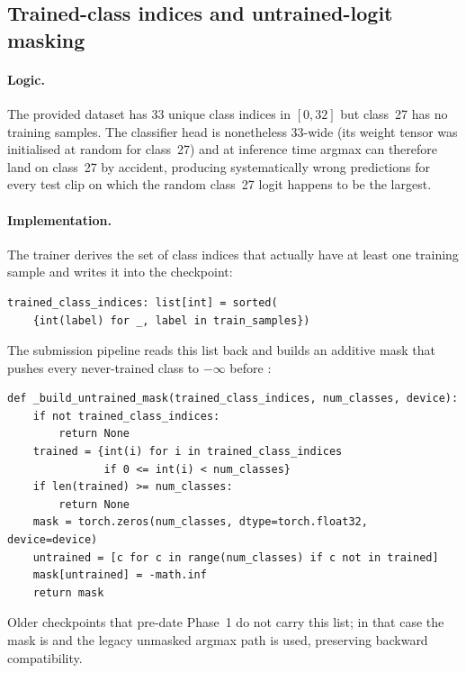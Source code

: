 \subsection{Trained-class indices and untrained-logit masking}
\label{sec:phase1:masking}

\paragraph{Logic.} The provided dataset has 33 unique class indices in
\([0, 32]\) but class~27 has no training samples. The classifier head is
nonetheless 33-wide (its weight tensor was initialised at random for
class~27) and at inference time argmax can therefore land on class~27 by
accident, producing systematically wrong predictions for every test
clip on which the random class~27 logit happens to be the largest.

\paragraph{Implementation.} The trainer derives the set of class indices
that actually have at least one training sample and writes it into the
checkpoint:

\begin{lstlisting}[style=py]
trained_class_indices: list[int] = sorted(
    {int(label) for _, label in train_samples})
\end{lstlisting}

The submission pipeline reads this list back and builds an additive mask
that pushes every never-trained class to \(-\infty\) before
:

\begin{lstlisting}[style=py]
def _build_untrained_mask(trained_class_indices, num_classes, device):
    if not trained_class_indices:
        return None
    trained = {int(i) for i in trained_class_indices
               if 0 <= int(i) < num_classes}
    if len(trained) >= num_classes:
        return None
    mask = torch.zeros(num_classes, dtype=torch.float32, device=device)
    untrained = [c for c in range(num_classes) if c not in trained]
    mask[untrained] = -math.inf
    return mask
\end{lstlisting}

Older checkpoints that pre-date Phase~1 do not carry this list; in that
case the mask is  and the legacy unmasked argmax path is used,
preserving backward compatibility.

